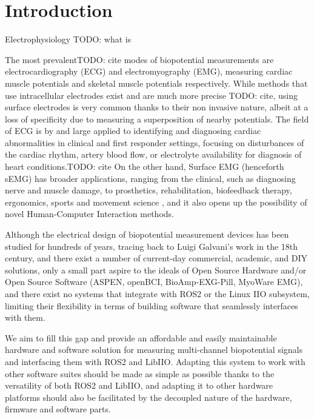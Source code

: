 \documentclass{thesis}
\newcommand{\todo}[1]{{\color{red}TODO: #1}}
\begin{document}

\maketableofcontents

\section{Introduction}

Electrophysiology \todo{what is}

The most prevalent\todo{cite} modes of biopotential measurements are electrocardiography (ECG) and electromyography (EMG), measuring cardiac muscle potentials and skeletal muscle potentials respectively. While methods that use intracellular electrodes exist and are much more precise \todo{cite}, using surface electrodes is very common thanks to their non invasive nature, albeit at a loss of specificity due to measuring a superposition of nearby potentials. The field of ECG is by and large applied to identifying and diagnosing cardiac abnormalities in clinical and first responder settings, focusing on disturbances of the cardiac rhythm, artery blood flow, or electrolyte availability for diagnosis of heart conditions.\todo{cite} On the other hand, Surface EMG (henceforth sEMG) has broader applications, ranging from the clinical, such as diagnosing nerve and muscle damage, to prosthetics, rehabilitation, biofeedback therapy, ergonomics, sports and movement science \cite{Barbero2012}, and it also opens up the possibility of novel Human-Computer Interaction methods.

Although the electrical design of biopotential measurement devices has been studied for hundreds of years, tracing back to Luigi Galvani's work in the 18th century, and there exist a number of current-day commercial, academic, and DIY solutions, only a small part aspire to the ideals of Open Source Hardware and/or Open Source Software (ASPEN\cite{Esposito2018}, openBCI\cite{openbci}, BioAmp-EXG-Pill\cite{pill}, MyoWare EMG\cite{myoware}), and there exist no systems that integrate with ROS2 or the Linux IIO subsystem, limiting their flexibility in terms of building software that seamlessly interfaces with them.

We aim to fill this gap and provide an affordable and easily maintainable hardware and software solution for measuring multi-channel biopotential signals and interfacing them with ROS2 and LibIIO. Adapting this system to work with other software suites should be made as simple as possible thanks to the versatility of both ROS2 and LibIIO, and adapting it to other hardware platforms should also be facilitated by the decoupled nature of the hardware, firmware and software parts.
\end{document}
